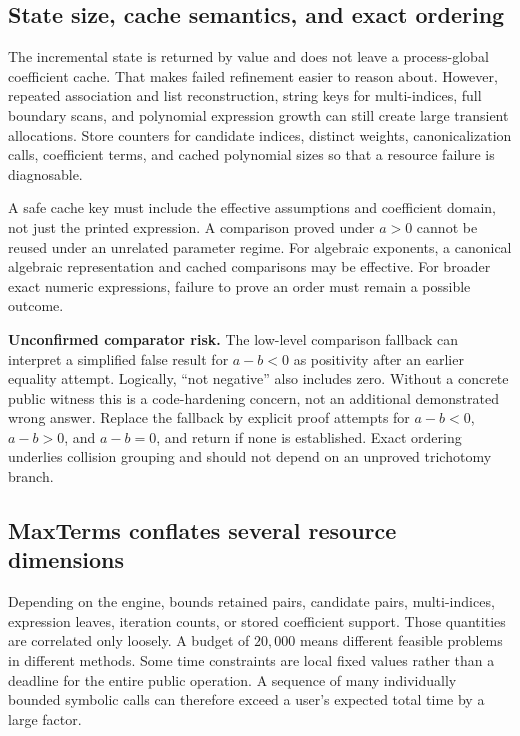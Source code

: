 \documentclass[11pt,letterpaper]{article}
\newcommand{\code}[1]{\texttt{\small\detokenize{#1}}}
\begin{document}
\subsection{State size, cache semantics, and exact ordering}
The incremental state is returned by value and does not leave a process-global coefficient cache. That makes failed refinement easier to reason about. However, repeated association and list reconstruction, string keys for multi-indices, full boundary scans, and polynomial expression growth can still create large transient allocations. Store counters for candidate indices, distinct weights, canonicalization calls, coefficient terms, and cached polynomial sizes so that a resource failure is diagnosable.\cite{repo-incremental}

A safe cache key must include the effective assumptions and coefficient domain, not just the printed expression. A comparison proved under $a>0$ cannot be reused under an unrelated parameter regime. For algebraic exponents, a canonical algebraic representation and cached comparisons may be effective. For broader exact numeric expressions, failure to prove an order must remain a possible outcome.

\textbf{Unconfirmed comparator risk.} The low-level comparison fallback can interpret a simplified false result for $a-b<0$ as positivity after an earlier equality attempt. Logically, ``not negative'' also includes zero. Without a concrete public witness this is a code-hardening concern, not an additional demonstrated wrong answer. Replace the fallback by explicit proof attempts for $a-b<0$, $a-b>0$, and $a-b=0$, and return \code{UndecidableOrder} if none is established. Exact ordering underlies collision grouping and should not depend on an unproved trichotomy branch.\cite{repo-core}

\subsection{MaxTerms conflates several resource dimensions}
Depending on the engine, \code{MaxTerms} bounds retained pairs, candidate pairs, multi-indices, expression leaves, iteration counts, or stored coefficient support. Those quantities are correlated only loosely. A budget of $20,000$ means different feasible problems in different methods. Some time constraints are local fixed values rather than a deadline for the entire public operation. A sequence of many individually bounded symbolic calls can therefore exceed a user's expected total time by a large factor.\cite{repo-core,repo-envelope,repo-native,repo-fourier}
\end{document}
